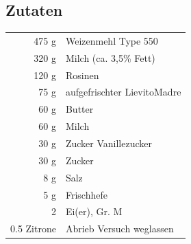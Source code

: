 %
%
\subsection*{Zutaten}
\begin{tabular}{r l}
          475 g & Weizenmehl Type 550          \\
          320 g & Milch (ca. 3,5\% Fett)       \\
          120 g & Rosinen                      \\
           75 g & aufgefrischter \Gls{LievitoMadre} \\
           60 g & Butter                       \\
           60 g & Milch                        \\
           30 g & Zucker Vanillezucker         \\
           30 g & Zucker                       \\
            8 g & Salz                         \\
            5 g & Frischhefe                   \\
              2 & Ei(er), Gr. M                \\
    0.5 Zitrone & Abrieb Versuch weglassen
\end{tabular}\\



